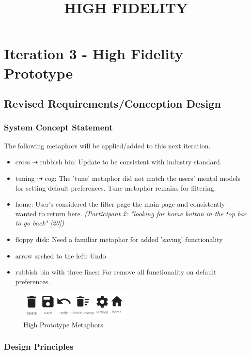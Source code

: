 \documentclass[a4 paper, 12pt]{article}
\title{HIGH FIDELITY}
\begin{document}
    
\section{Iteration 3 - High Fidelity Prototype}

    \subsection{Revised Requirements/Conception Design}

    \subsubsection{System Concept Statement}    
    The following metaphors will be applied/added to this next iteration.
        \begin{itemize}
            \item cross $\dashrightarrow$ rubbish bin: Update to be consistent with industry standard.
            \item tuning $\dashrightarrow$ cog: The 'tune' metaphor did not match the users' mental models for setting default preferences. Tune metaphor remains for filtering. 
            \item home: User's considered the filter page the main page and consistently wanted to return here. \textit{(Participant 2: "looking for home button in the top bar to go back" [20])}
            \item floppy disk: Need a familiar metaphor for added 'saving' functionality
            \item arrow arched to the left: Undo
            \item rubbish bin with three lines: For remove all functionality on default preferences.
        \end{itemize}

        \begin{figure} [H]
            \centering
            \includegraphics[width=0.5\textwidth, frame]
                {./High_Fidelity/High_Report/images/high_icons.PNG}  
            \caption{High Prototype Metaphors}
        \end{figure}  

    \subsubsection{Design Principles}
\end{document}
